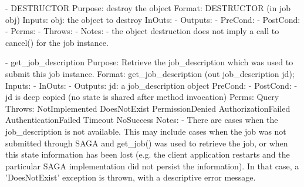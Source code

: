  
 \begin{myspec}
    - DESTRUCTOR
      Purpose:  destroy the object
      Format:   DESTRUCTOR        (in  job  obj)
      Inputs:   obj:               the object to destroy
      InOuts:   -
      Outputs:  -
      PreCond:  -
      PostCond: -
      Perms:    -
      Throws:   -
      Notes:    - the object destruction does not imply a 
                  call to cancel() for the job instance.
 
 
    - get_job_description
      Purpose:  Retrieve the job_description which was used to
                submit this job instance.
      Format:   get_job_description (out job_description jd);
      Inputs:   -
      InOuts:   -
      Outputs:  jd:                  a job_description object
      PreCond:  -
      PostCond: - jd is deep copied (no state is shared
                  after method invocation)
      Perms:    Query
      Throws:   NotImplemented
                DoesNotExist
                PermissionDenied
                AuthorizationFailed
                AuthenticationFailed
                Timeout
                NoSuccess
      Notes:    - There are cases when the job_description is not
                  available.  This may include cases when
                  the job was not submitted through
                  SAGA and get_job() was used to retrieve the
                  job, or when this state information has been
                  lost (e.g. the client application restarts and
                  the particular SAGA implementation did not
                  persist the information).  In that case, a
                  'DoesNotExist' exception is thrown, with a
                  descriptive error message.
 

\end{myspec}
